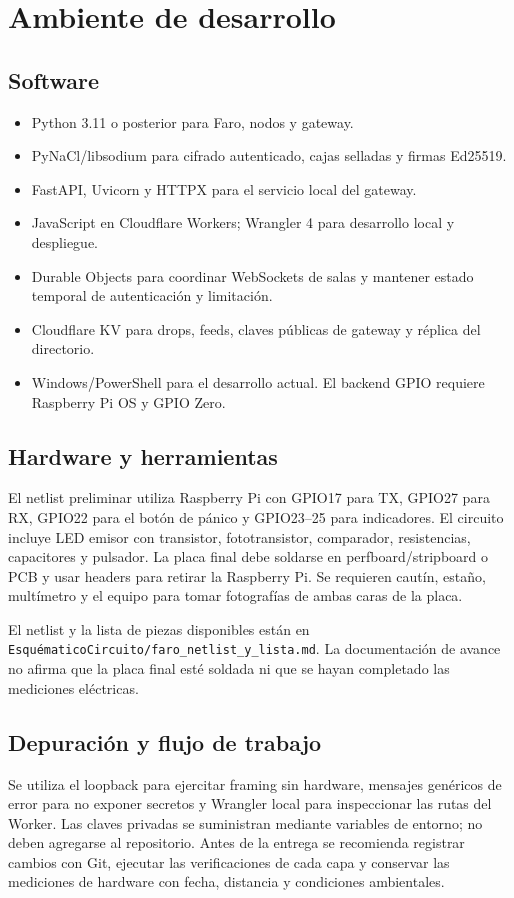\documentclass[12pt,a4paper]{article}
\begin{document}
\section{Ambiente de desarrollo}

\subsection{Software}
\begin{itemize}
  \item Python 3.11 o posterior para Faro, nodos y gateway.
  \item PyNaCl/libsodium para cifrado autenticado, cajas selladas y firmas Ed25519.
  \item FastAPI, Uvicorn y HTTPX para el servicio local del gateway.
  \item JavaScript en Cloudflare Workers; Wrangler 4 para desarrollo local y despliegue.
  \item Durable Objects para coordinar WebSockets de salas y mantener estado temporal de autenticación y limitación.
  \item Cloudflare KV para drops, feeds, claves públicas de gateway y réplica del directorio.
  \item Windows/PowerShell para el desarrollo actual. El backend GPIO requiere Raspberry Pi OS y GPIO Zero.
\end{itemize}

\subsection{Hardware y herramientas}
El netlist preliminar utiliza Raspberry Pi con GPIO17 para TX, GPIO27 para RX,
GPIO22 para el botón de pánico y GPIO23--25 para indicadores. El circuito
incluye LED emisor con transistor, fototransistor, comparador, resistencias,
capacitores y pulsador. La placa final debe soldarse en perfboard/stripboard o
PCB y usar headers para retirar la Raspberry Pi. Se requieren cautín, estaño,
multímetro y el equipo para tomar fotografías de ambas caras de la placa.

El netlist y la lista de piezas disponibles están en
\texttt{EsquématicoCircuito/faro\_netlist\_y\_lista.md}. La documentación de
avance no afirma que la placa final esté soldada ni que se hayan completado las
mediciones eléctricas.

\subsection{Depuración y flujo de trabajo}
Se utiliza el loopback para ejercitar framing sin hardware, mensajes genéricos
de error para no exponer secretos y Wrangler local para inspeccionar las rutas
del Worker. Las claves privadas se suministran mediante variables de entorno;
no deben agregarse al repositorio. Antes de la entrega se recomienda registrar
cambios con Git, ejecutar las verificaciones de cada capa y conservar las
mediciones de hardware con fecha, distancia y condiciones ambientales.
\end{document}
